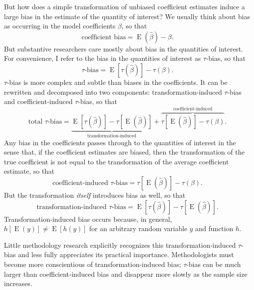 \documentclass[12pt]{article}
\DeclareMathOperator*{\E}{\text{E}}
\begin{document}
But how does a simple transformation of unbiased coefficient estimates induce a large bias in the estimate of the quantity of interest?
We usually think about bias as occurring in the model coefficients $\beta$, so that 
\begin{equation}
\text{coefficient bias} = \E(\hat{\beta}) - \beta \text{.}  \nonumber
\end{equation}
But substantive researchers care mostly about bias in the quantities of interest. 
For convenience, I refer to the bias in the quantities of interest as $\tau$-bias, so that
\begin{equation}
\tau\text{-bias} = \E[\tau(\hat{\beta})] - \tau(\beta)\text{.} \nonumber
\end{equation}
$\tau$-bias is more complex and subtle than biases in the coefficients. 
It can be rewritten and decomposed into two components: transformation-induced $\tau$-bias and coefficient-induced $\tau$-bias, so that
\begin{equation}
\text{total } \tau\text{-bias}= \underbrace{ \E[\tau(\hat{\beta})]-  \tau[\E(\hat{\beta})]  }_{\text{transformation-induced}} + \overbrace{  \tau[\E(\hat{\beta})] - \tau(\beta)  }^{\text{coefficient-induced}}\text{.} \nonumber
\end{equation}
Any bias in the coefficients passes through to the quantities of interest in the sense that, if the coefficient estimates are biased, then the transformation of the true coefficient is not equal to the transformation of the average coefficient estimate, so that
\begin{equation}
\text{coefficient-induced } \tau\text{-bias} = \tau[\E(\hat{\beta})] - \tau(\beta) \text{.}\nonumber
\end{equation}
But the transformation \textit{itself} introduces bias as well, so that
\begin{equation}
\text{transformation-induced } \tau\text{-bias} = \E[\tau(\hat{\beta})]-  \tau[\E(\hat{\beta})] \text{.}\nonumber
\end{equation}
Transformation-induced bias occurs because, in general, $h[\E(y)] \neq \E[h(y)]$ for an arbitrary random variable $y$ and function $h$.

Little methodology research explicitly recognizes this transformation-induced $\tau$-bias and less fully appreciates its practical importance. 
Methodologists must become more conscientious of transformation-induced bias; $\tau$-bias can be much larger than coefficient-induced bias and disappear more slowly as the sample size increases.
\end{document}
